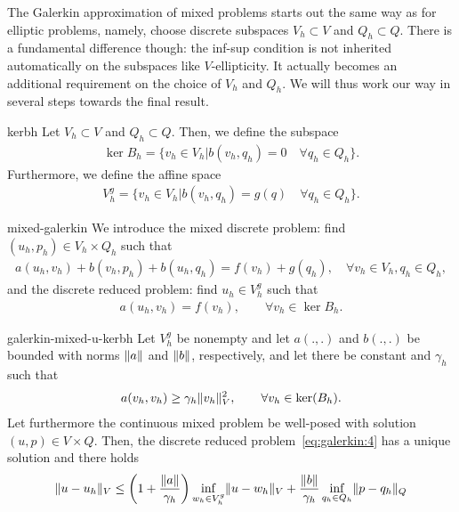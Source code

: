 \begin{intro}
  The Galerkin approximation of mixed problems starts out the same way
  as for elliptic problems, namely, choose discrete subspaces
  $V_h\subset V$ and $Q_h \subset Q$. There is a fundamental
  difference though: the inf-sup condition is not inherited
  automatically on the subspaces like $V$-ellipticity. It actually becomes an additional requirement on the choice of $V_h$ and
  $Q_h$. We will thus work our way in several steps towards the final
  result.
\end{intro}

\begin{Definition}{kerbh}
  Let $V_h\subset V$ and $Q_h\subset Q$. Then, we define the subspace
  \begin{gather}
    \label{eq:galerkin:1}
    \ker{B_h} = \bigl\{v_h\in V_h \big|
    b(v_h, q_h) = 0 \quad\forall q_h\in Q_h
    \bigr\}.
  \end{gather}
  Furthermore, we define the affine space
  \begin{gather}
    \label{eq:galerkin:2}
    V_h^g =  \bigl\{v_h\in V_h \big|
    b(v_h, q_h) = g(q) \quad\forall q_h\in Q_h
    \bigr\}.
  \end{gather}
\end{Definition}


\begin{Definition}{mixed-galerkin}
We introduce the mixed discrete problem: find $(u_h,p_h)\in
  V_h\times Q_h$ such that
  \begin{gather}
    \label{eq:galerkin:3}
    a(u_h, v_h) + b(v_h, p_h) + b(u_h, q_h) = f(v_h)+g(q_h),
    \quad\forall v_h\in V_h, q_h\in Q_h,
  \end{gather}
  and the discrete reduced problem: find $u_h\in V_h^g$ such that
  \begin{gather}
    \label{eq:galerkin:4}
    a(u_h, v_h) = f(v_h), \qquad\forall v_h \in \ker{B_h}.
  \end{gather}
\end{Definition}

\begin{Theorem}{galerkin-mixed-u-kerbh}
  Let $V_h^g$ be nonempty and let $a(.,.)$ and $b(.,.)$ be bounded
  with norms $\lVert a\rVert$ and $\lVert b\rVert$, respectively, and let there be constant and $\gamma_h$
  such that
  \begin{gather}
    \label{eq:galerkin:5}
    a(v_h, v_h) \ge \gamma_h \lVert v_h\rVert^2_V,
    \qquad\forall v_h\in \operatorname{ker}(B_h).      
  \end{gather}
  Let furthermore the continuous mixed problem be well-posed with
  solution $(u,p)\in V\times Q$.
  Then, the discrete reduced problem~\eqref{eq:galerkin:4} has a
  unique solution and there holds
  \begin{gather}
    \label{eq:galerkin:8}
    \lVert u-u_h\rVert_V \le \left(1+\frac{\lVert a\rVert}{\gamma_h}\right)
    \inf_{w_h\in V_h^g}\lVert u-w_h\rVert_V
    + \frac{\lVert b\rVert}{\gamma_h}
    \inf_{q_h\in Q_h}\lVert p-q_h\rVert_Q
  \end{gather}
\end{Theorem}

